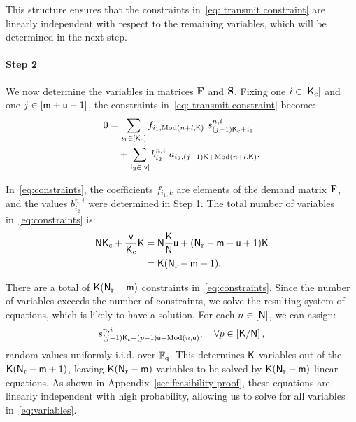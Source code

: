 \documentclass[conference,letterpaper]{IEEEtran}
\begin{document}
This structure ensures that the constraints in~\eqref{eq: transmit constraint} are linearly independent with respect to the remaining variables, which will be determined in the next step.



\paragraph*{Step 2}
We now determine the variables in matrices \( {\bf F} \) and \( {\bf S} \). Fixing one \( i \in [{\sf K}_{\rm c}] \) and one \( j \in [{\sf m}+{\sf u}-1] \), the constraints in~\eqref{eq: transmit constraint} become:
\begin{align}
\begin{aligned}
0 &= \sum_{i_1 \in [\Ksf_{\rm c}]} f_{i_1,\text{Mod}(n+l,\Ksf)} \ s^{n,i}_{(j-1)\Ksf_{\rm c}+i_1} \\
&\quad + \sum_{i_2 \in [\vsf]} b^{n,i}_{i_2} \ a_{i_2,(j-1)\Ksf+\text{Mod}(n+l,\Ksf)}.
\end{aligned}
\label{eq:constraints}
\end{align}

In~\eqref{eq:constraints}, the coefficients \( f_{i_1,k} \) are elements of the demand matrix \({\bf F}\), and the values \( b^{n,i}_{i_2} \) were determined in Step 1. The total number of variables in~\eqref{eq:constraints} is:
\begin{align}
{\sf N} {\sf K}_{\rm c} + \frac{{\sf v}}{{\sf K}_{\rm c}} {\sf K} 
&= {\sf N} \frac{{\sf K}}{{\sf N}} {\sf u} + ({\sf N}_{\rm r} - {\sf m} - {\sf u} + 1) {\sf K} \notag \\
&= {\sf K} ({\sf N}_{\rm r} - {\sf m} + 1). \label{eq:variables}
\end{align}

There are a total of \( {\sf K}({\sf N}_{\rm r}-{\sf m}) \) constraints in~\eqref{eq:constraints}. Since the number of variables exceeds the number of constraints, we solve the resulting system of equations, which is likely to have a solution. For each \( n \in [{\sf N}] \), we can assign:
\begin{align}
s^{n,i}_{(j-1){\sf K}_{\rm c}+(p-1){\sf u} +\text{Mod}(n,{\sf u})}, \quad \forall p \in \left[{\sf K}/{\sf N}\right], \label{eq:choose value}
\end{align}
random values uniformly i.i.d. over \( \mathbb{F}_{{\sf q}} \). This determines \( {\sf K} \) variables out of the \( {\sf K}({\sf N}_{\rm r}-{\sf m} + 1) \), leaving \( {\sf K}({\sf N}_{\rm r}-{\sf m}) \) variables to be solved by \( {\sf K}({\sf N}_{\rm r}-{\sf m}) \) linear equations.
As shown in Appendix~\ref{sec:feasibility proof}, these equations are linearly independent with high probability, allowing us to solve for all variables in~\eqref{eq:variables}.
\end{document}
